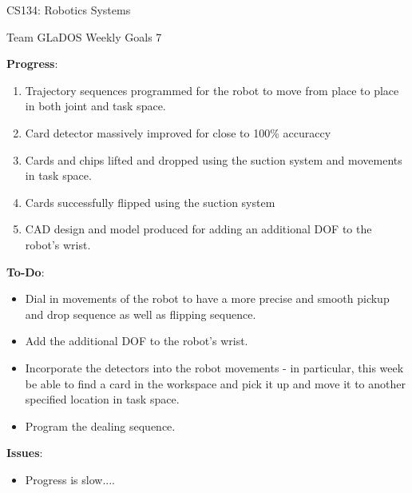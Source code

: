 \documentclass[12 pt]{article}
\newcommand{\setnum}{7}
\begin{document}
\begin{center}
    \Large \color{blue} CS134: Robotics Systems\color{black}
    \begin{center}\normalsize Team GLaDOS Weekly Goals \setnum{}\end{center}
    \noindent{\color{black} \rule{\linewidth}{0.5mm} }
\end{center}

\textbf{Progress}:
    \begin{enumerate}
        \item Trajectory sequences programmed for the robot to move from place to 
        place in both joint and task space. 
        \item Card detector massively improved for close to 100\% accuraccy 
        \item Cards and chips lifted and dropped using the suction system and movements in task space.
        \item Cards successfully flipped using the suction system
        \item CAD design and model produced for adding an additional DOF to the 
        robot's wrist.
    \end{enumerate}

\textbf{To-Do}:
    \begin{itemize}
        \item Dial in movements of the robot to have a more precise and smooth pickup and 
        drop sequence as well as flipping sequence.
        \item Add the additional DOF to the robot's wrist.
        \item Incorporate the detectors into the robot movements - in particular, this week be 
        able to find a card in the workspace and pick it up and move it to another specified location 
        in task space.
        \item Program the dealing sequence.
    \end{itemize}

\textbf{Issues}:
    \begin{itemize}
        \item Progress is slow....
    \end{itemize}
\end{document}
